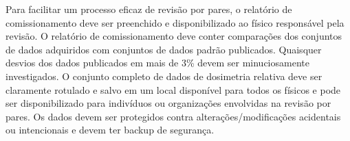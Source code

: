 \documentclass[11pt,a4paper]{article}
\begin{document}
	Para facilitar um processo eficaz de revisão por pares, o relatório de comissionamento deve ser preenchido e disponibilizado ao físico responsável pela revisão. O relatório de comissionamento deve conter comparações dos conjuntos de dados adquiridos com conjuntos de dados padrão publicados. Quaisquer desvios dos dados publicados em mais de 3\% devem ser minuciosamente investigados. O conjunto completo de dados de dosimetria relativa deve ser claramente rotulado e salvo em um local disponível para todos os físicos e pode ser disponibilizado para indivíduos ou organizações envolvidas na revisão por pares. Os dados devem ser protegidos contra alterações/modificações acidentais ou intencionais e devem ter backup de segurança.


\end{document}
